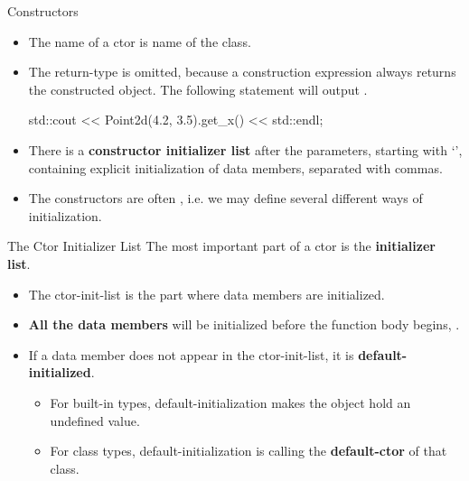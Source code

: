 \documentclass{beamer}
\begin{document}
\begin{frame}[fragile]{Constructors}
    \begin{itemize}
        \item The name of a ctor is name of the class.
        \item The return-type is omitted, because a construction expression always returns the constructed object. The following statement will output .
        \begin{cpp}
std::cout << Point2d(4.2, 3.5).get_x() << std::endl;
        \end{cpp}
        \item There is a \textbf{constructor initializer list} after the parameters, starting with `\ttt{:}', containing explicit initialization of  data members, separated with commas.
        \item The constructors are often , i.e. we may define several different ways of initialization.
    \end{itemize}
\end{frame}

\begin{frame}{The Ctor Initializer List}
    The most important part of a ctor is the \textbf{initializer list}.
    \begin{itemize}
        \item The ctor-init-list is the part where data members are initialized.
        \item \textbf{All the data members} will be initialized before the function body begins, .
        \item If a data member does not appear in the ctor-init-list, it is \textbf{default-initialized}.
        \begin{itemize}
            \item For built-in types, default-initialization makes the object hold an undefined value.
            \item For class types, default-initialization is calling the \textbf{default-ctor} of that class.
        \end{itemize}
    \end{itemize}
\end{frame}
\end{document}
